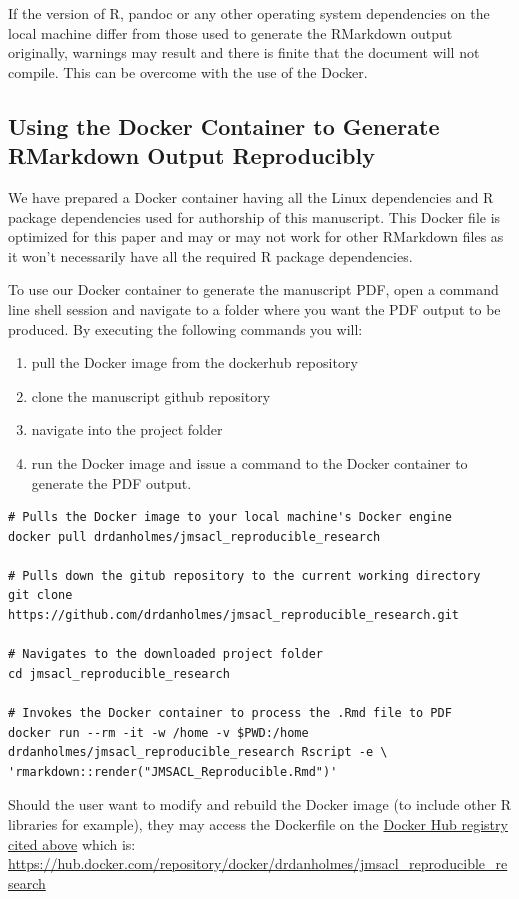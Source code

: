 \documentclass[]{elsarticle} %
\providecommand{\tightlist}{%
  \setlength{\itemsep}{0pt}\setlength{\parskip}{0pt}}
\begin{document}
If the version of R, pandoc or any other operating system dependencies
on the local machine differ from those used to generate the RMarkdown
output originally, warnings may result and there is finite that the
document will not compile. This can be overcome with the use of the
Docker.

\hypertarget{using-the-docker-container-to-generate-rmarkdown-output-reproducibly}{%
\subsection*{Using the Docker Container to Generate RMarkdown Output
Reproducibly}\label{using-the-docker-container-to-generate-rmarkdown-output-reproducibly}}

We have prepared a Docker container having all the Linux dependencies
and R package dependencies used for authorship of this manuscript. This
Docker file is optimized for this paper and may or may not work for
other RMarkdown files as it won't necessarily have all the required R
package dependencies.

To use our Docker container to generate the manuscript PDF, open a
command line shell session and navigate to a folder where you want the
PDF output to be produced. By executing the following commands you will:

\begin{enumerate}
\def\labelenumi{\arabic{enumi})}
\tightlist
\item
  pull the Docker image from the dockerhub repository
\item
  clone the manuscript github repository
\item
  navigate into the project folder
\item
  run the Docker image and issue a command to the Docker container to
  generate the PDF output.
\end{enumerate}

\begin{verbatim}
# Pulls the Docker image to your local machine's Docker engine
docker pull drdanholmes/jmsacl_reproducible_research

# Pulls down the gitub repository to the current working directory
git clone https://github.com/drdanholmes/jmsacl_reproducible_research.git

# Navigates to the downloaded project folder
cd jmsacl_reproducible_research

# Invokes the Docker container to process the .Rmd file to PDF
docker run --rm -it -w /home -v $PWD:/home drdanholmes/jmsacl_reproducible_research Rscript -e \
'rmarkdown::render("JMSACL_Reproducible.Rmd")'
\end{verbatim}

Should the user want to modify and rebuild the Docker image (to include
other R libraries for example), they may access the Dockerfile on the
\href{https://hub.docker.com/repository/docker/drdanholmes/jmsacl_reproducible_research}{Docker
Hub registry cited above} which is:
\url{https://hub.docker.com/repository/docker/drdanholmes/jmsacl_reproducible_research}
\end{document}
